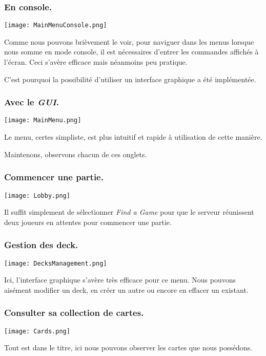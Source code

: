 \documentclass[12pt]{article}
\begin{document}
		\subsubsection{En console.}
		\begin{center}\texttt{[image: MainMenuConsole.png]}\end{center}
		Comme nous pouvons brièvement le voir, pour naviguer dans les menus lorsque nous somme en mode console, il est nécessaires d'entrer les commandes affichés à l'écran.
		Ceci s'avère efficace mais néanmoins peu pratique.

		C'est pourquoi la possibilité d'utiliser un interface graphique a été implémentée.

		\subsubsection{Avec le \textit{\gls{GUI}}.}
		\begin{center}\texttt{[image: MainMenu.png]}\end{center}
		Le menu, certes simpliste, est plus intuitif et rapide à utilisation de cette manière.

		Maintenons, observons chacun de ces onglets.

		\newpage
		\subsubsection{Commencer une partie.}
		\begin{center}\texttt{[image: Lobby.png]}\end{center}
		Il suffit simplement de sélectionner \textit{Find a Game} pour que le serveur réunissent deux joueurs en attentes pour commencer une partie.


		\subsubsection{Gestion des \gls{deck}.}
		\begin{center}\texttt{[image: DecksManagement.png]}\end{center}
		Ici, l'interface graphique s'avère très efficace pour ce menu. Nous pouvons aisément modifier un deck, en créer un autre ou encore en effacer un existant.

		\subsubsection{Consulter sa collection de cartes.}
		\begin{center}\texttt{[image: Cards.png]}\end{center}
		Tout est dans le titre, ici nous pouvons observer les cartes que nous possédons.
\end{document}
